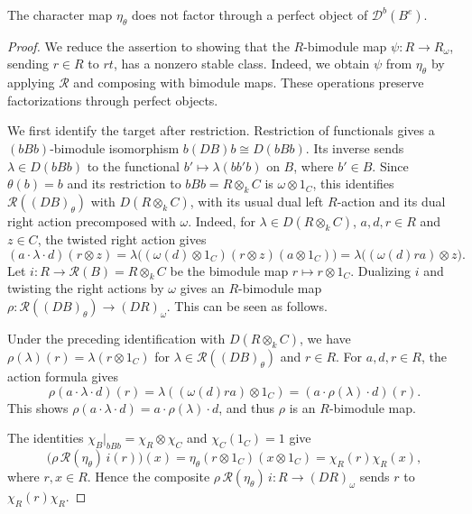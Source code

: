 \documentclass[11pt]{article}
\begin{document}
\begin{Prop}\label{lift:trace-obstruction}
The character map $\eta_\theta$ does not factor
through a perfect object of $\mathscr D^b(B^e)$.
\end{Prop}

\begin{proof}
We reduce the assertion to showing that the $R$-bimodule map
$\psi:R\to R_\omega$, sending $r\in R$ to $rt$, has a nonzero stable class.
Indeed, we obtain $\psi$ from $\eta_\theta$ by applying $\mathcal R$
and composing with bimodule maps. These operations preserve
factorizations through perfect objects.

We first identify the target after restriction. Restriction of functionals gives a $(bBb)$-bimodule isomorphism $b(DB)b\cong D(bBb)$. Its inverse sends
$\lambda\in D(bBb)$ to the functional $b'\mapsto\lambda(bb'b)$ on $B$, where $b'\in B$.
Since $\theta(b)=b$ and its restriction to $bBb=R\otimes_k C$ is
$\omega\otimes1_C$, this identifies
$\mathcal R((DB)_\theta)$ with $D(R\otimes_k C)$, with its usual
dual left $R$-action and its dual right action precomposed with
$\omega$. Indeed, for $\lambda\in D(R\otimes_k C)$,
$a,d, r\in R$ and $z\in C$, the twisted right action gives
\[
 (a\cdot\lambda\cdot d)(r\otimes z)
 =\lambda\bigl((\omega(d)\otimes1_C)(r\otimes z)(a\otimes1_C)\bigr)
 =\lambda\bigl((\omega(d)ra)\otimes z\bigr).
\]
Let $i:R\to\mathcal R(B)=R\otimes_k C$ be the bimodule map $r\mapsto r\otimes1_C$. Dualizing $i$ and twisting the right actions by $\omega$ gives an $R$-bimodule map
$\rho:\mathcal R((DB)_\theta)\to(DR)_\omega$. This can be seen as follows.

Under the preceding identification with $D(R\otimes_k C)$,
we have $\rho(\lambda)(r)=\lambda(r\otimes1_C)$ for
$\lambda\in\mathcal R((DB)_\theta)$ and $r\in R$.
For $a,d,r\in R$, the action formula gives
\[
 \rho(a\cdot\lambda\cdot d)(r)
 =\lambda((\omega(d)ra)\otimes1_C)
 =(a\cdot\rho(\lambda)\cdot d)(r).
\]
This shows $\rho(a\cdot\lambda\cdot d)=a\cdot\rho(\lambda)\cdot d$, and thus $\rho$ is an $R$-bimodule map.

The identities
$\chi_B|_{bBb}=\chi_R\otimes\chi_C$ and $\chi_C(1_C)=1$ give
\[
 \bigl(\rho\,\mathcal R(\eta_\theta)\,i(r)\bigr)(x)
 =\eta_\theta(r\otimes1_C)(x\otimes1_C)
 =\chi_R(r)\chi_R(x),
\]
where $r,x\in R$. Hence the composite $\rho\,\mathcal R(\eta_\theta)\,i: R\to (DR)_\omega$ sends $r$ to $\chi_R(r)\chi_R$.


\end{proof}
\end{document}
